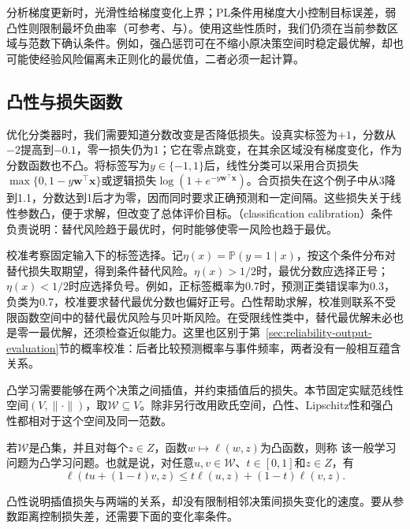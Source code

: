 分析梯度更新时，光滑性给梯度变化上界；PL条件用梯度大小控制目标误差，弱凸性则限制最坏负曲率（可参考、与）。使用这些性质时，我们仍须在当前参数区域与范数下确认条件。例如，强凸惩罚可在不缩小原决策空间时稳定最优解，却也可能使经验风险偏离未正则化的最优值，二者必须一起计算。

\subsection{凸性与损失函数}

优化分类器时，我们需要知道分数改变是否降低损失。设真实标签为$+1$，分数从$-2$提高到$-0.1$，零一损失仍为1；它在零点跳变，在其余区域没有梯度变化，作为分数函数也不凸。将标签写为$y\in\{-1,1\}$后，线性分类可以采用合页损失$\max\{0,1-y\bm w^\top\bm x\}$或逻辑损失$\log(1+e^{-y\bm w^\top\bm x})$。合页损失在这个例子中从3降到1.1，分数达到1后才为零，因而同时要求正确预测和一定间隔。这些损失关于线性参数凸，便于求解，但改变了总体评价目标。（classification calibration）条件负责说明：替代风险趋于最优时，何时能够使零一风险也趋于最优。

校准考察固定输入下的标签选择。记$\eta(x)=\mathbb P(y=1\mid x)$，按这个条件分布对替代损失取期望，得到条件替代风险。$\eta(x)>1/2$时，最优分数应选择正号；$\eta(x)<1/2$时应选择负号。例如，正标签概率为0.7时，预测正类错误率为0.3，负类为0.7，校准要求替代最优分数也偏好正号。凸性帮助求解，校准则联系不受限函数空间中的替代最优风险与贝叶斯风险。在受限线性类中，替代最优解未必也是零一最优解，还须检查近似能力。这里也区别于第~\ref{sec:reliability-output-evaluation}节的概率校准：后者比较预测概率与事件频率，两者没有一般相互蕴含关系。

凸学习需要能够在两个决策之间插值，并约束插值后的损失。本节固定实赋范线性空间$(V,\|\cdot\|)$，取$\mathcal W\subseteq V$。除非另行改用欧氏空间，凸性、Lipschitz性和强凸性都相对于这个空间及同一范数。

\begin{definition}[凸学习问题]
\label{def:convex-learning-problem}
若$\mathcal W$是凸集，并且对每个$z\in Z$，函数$w\mapsto\ell(w,z)$为凸函数，则称
该一般学习问题为凸学习问题。也就是说，对任意$u,v\in\mathcal W$、$t\in[0,1]$和$z\in Z$，有
\[
 \ell(tu+(1-t)v,z)\leq t\ell(u,z)+(1-t)\ell(v,z).
\]
\end{definition}

凸性说明插值损失与两端的关系，却没有限制相邻决策间损失变化的速度。要从参数距离控制损失差，还需要下面的变化率条件。

